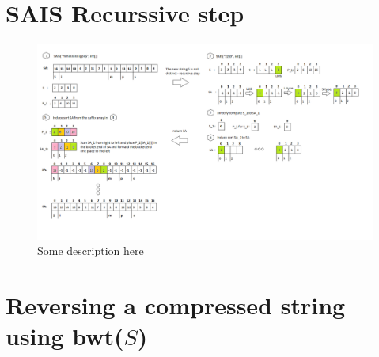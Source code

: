 \documentclass[12pt]{article} %
\begin{document}
\newpage
\section{SAIS Recurssive step}\label{SAIS Algorithm run}
\begin{figure}[H]
    \centering
    \includegraphics[width=1.1\textwidth]{SAIS_RECURSIVEDESCRIPTION}
    \captionsetup{width=0.8\textwidth}
    \caption{Some description here}
    \label{fig:SAIS_RECURSIVEDESCRIPTION}
\end{figure}
\newpage
\section{Reversing a compressed string using bwt($S$)}\label{BWT}
\newpage
\nocite{*}



\end{document}
